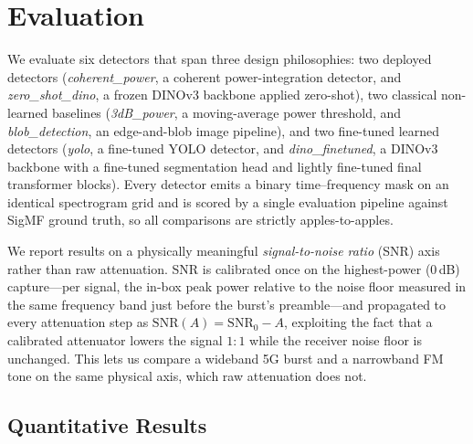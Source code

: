 \section{Evaluation}
\label{sec:eval}

We evaluate six detectors that span three design philosophies: two deployed
detectors (\emph{coherent\_power}, a coherent power-integration detector, and
\emph{zero\_shot\_dino}, a frozen DINOv3 backbone applied zero-shot), two classical
non-learned baselines (\emph{3dB\_power}, a moving-average power threshold, and
\emph{blob\_detection}, an edge-and-blob image pipeline), and two fine-tuned learned
detectors (\emph{yolo}, a fine-tuned YOLO detector, and \emph{dino\_finetuned}, a
DINOv3 backbone with a fine-tuned segmentation head and lightly fine-tuned final
transformer blocks). Every detector emits a binary
time--frequency mask on an identical spectrogram grid and is scored by a single
evaluation pipeline against SigMF ground truth, so all comparisons are strictly
apples-to-apples.

We report results on a physically meaningful \emph{signal-to-noise ratio} (SNR) axis
rather than raw attenuation. SNR is calibrated once on the highest-power (0\,dB)
capture---per signal, the in-box peak power relative to the noise floor measured in
the same frequency band just before the burst's preamble---and propagated to every
attenuation step as $\mathrm{SNR}(A)=\mathrm{SNR}_0-A$, exploiting the fact that a
calibrated attenuator lowers the signal $1{:}1$ while the receiver noise floor is
unchanged. This lets us compare a wideband 5G burst and a narrowband FM tone on the
same physical axis, which raw attenuation does not.

\subsection{Quantitative Results}
\label{sec:eval:quant}

